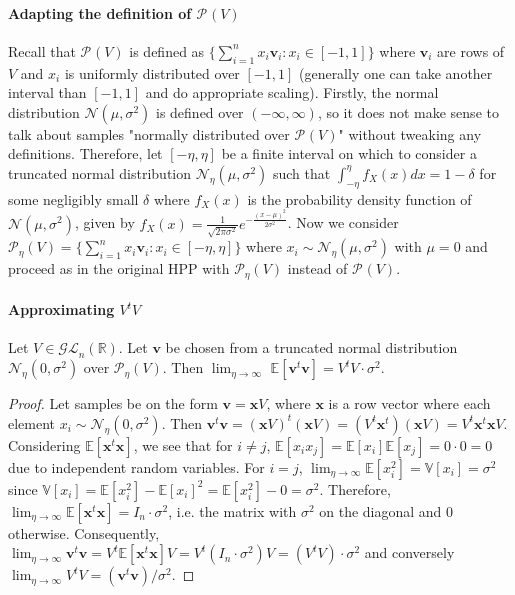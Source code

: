 \documentclass[12 pt]{article}        	%
\newcommand{\PP}[2][]{\mathcal{P}_{#1}(\mat{#2})}
\newcommand{\mat}[1]{\mathit{#1}}
\renewcommand{\vec}[1]{\mathbf{#1}}
\newcommand{\GLnR}{\mathcal{GL}_{n}(\mathbb{R})}
\newcommand{\normdist}[2]{\mathcal{N}(#1, #2^2)}
\newcommand{\bb}[1]{\mathbb{#1}}
\begin{document}
\paragraph{Adapting the definition of $\PP{V}$}
Recall that $\PP{V}$ is defined as $\{\sum_{i=1}^n x_i \vec{v}_i : x_i \in [-1, 1]\}$ where $\vec{v}_i$ are rows of $\mat{V}$ and $x_i$ is uniformly distributed over $[-1, 1]$ 
(generally one can take another interval than $[-1, 1]$ and do appropriate scaling).
Firstly, the normal distribution $\normdist{\mu}{\sigma}$ is defined over $(- \infty, \infty)$, so it does not make sense to talk about samples "normally distributed over $\PP{V}$" without tweaking any definitions.
Therefore, let $[- \eta, \eta]$ be a finite interval on which to consider a truncated normal distribution $\mathcal{N}_{\eta}(\mu, \sigma^2)$ such that $\int_{-\eta}^{\eta} f_X(x) dx = 1 - \delta$ for some negligibly small $\delta$
where $f_X(x)$ is the probability density function of $\normdist{\mu}{\sigma}$, given by $f_X(x) = \frac{1}{\sqrt{2 \pi \sigma^2}} e^{-\frac{(x- \mu)^2}{2 \sigma^2}}$.
Now we consider $\PP[\eta]{V} = \{\sum_{i=1}^n x_i \vec{v}_i : x_i \in [-\eta, \eta]\}$ where $x_i \sim \mathcal{N}_{\eta}(\mu, \sigma^2)$ with $\mu = 0$ and proceed as in the original HPP with $\PP[\eta]{V}$ instead of $\PP{V}$.

\paragraph{Approximating $\mat{V}^t \mat{V}$}
Let $\mat{V} \in \GLnR$. Let $\vec{v}$ be chosen from a truncated normal distribution $\mathcal{N}_{\eta}(0, \sigma^2)$ over $\PP[\eta]{V}$.
Then $\lim_{\eta\to\infty}$ $\bb{E}[\vec{v}^t\vec{v}] = \mat{V}^t \mat{V} \cdot \sigma^2$.

\begin{proof}
    Let samples be on the form $\vec{v} = \vec{x}\mat{V}$, where $\vec{x}$ is a row vector where each element $x_i \sim \mathcal{N}_{\eta}(0, \sigma^2)$.
    Then $\vec{v}^t\vec{v} = (\vec{x} \mat{V})^t (\vec{x} \mat{V}) = (\mat{V}^t \vec{x}^t)(\vec{x} \mat{V}) = \mat{V}^t \vec{x}^t \vec{x} \mat{V}$. Considering $\bb{E}[\vec{x}^t \vec{x}]$, we see that for $i \neq j$, 
$\bb{E}[x_i x_j] = \bb{E}[x_i] \bb{E}[x_j] = 0 \cdot 0 = 0$ due to independent random variables.
For $i=j$, $\lim_{\eta\to\infty} \bb{E}[x_i^2] = \bb{V}[x_i] = \sigma^2$ since $\bb{V}[x_i] = \bb{E}[x_i^2] - \bb{E}[x_i]^2 = \bb{E}[x_i^2] - 0 = \sigma ^2$.
Therefore, $\lim_{\eta\to\infty} \bb{E}[\vec{x}^t \vec{x}] = \mat{I}_n \cdot \sigma^2$, i.e. the matrix with $\sigma ^2$ on the diagonal and 0 otherwise.
Consequently, $\lim_{\eta\to\infty} \vec{v}^t \vec{v} = \mat{V}^t \bb{E}[\vec{x}^t\vec{x}] \mat{V} = \mat{V}^t (\mat{I}_n \cdot \sigma^2) \mat{V} = (\mat{V}^t \mat{V}) \cdot \sigma ^2$ 
and conversely $\lim_{\eta\to\infty} \mat{V}^t \mat{V} = (\vec{v}^t \vec{v})/ \sigma^2$.
\end{proof}
\end{document}
